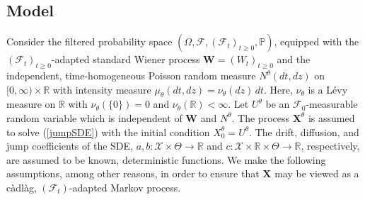 \documentclass[11pt,a4paper]{article}
\newcommand{\PP}{{\mathbb P}}
\newcommand{\RR}{{\mathbb R}}
\newcommand{\W}{{\mathbf W}}
\newcommand{\X}{{\mathbf X}}
\newcommand{\ff}{{\mathcal{F}}}
\newcommand{\xx}{{\mathcal{X}}}
\numberwithin{equation}{section}
\numberwithin{theorem}{section}
\begin{document}
\subsection{Model}
\label{subsection:model}
Consider the filtered probability space $(\Omega, \ff, (\ff_t)_{t\geq 0}, \PP)$, equipped with the $(\ff_t)_{t\geq 0}$-adapted standard Wiener process $\W = (W_t)_{t\geq 0}$ and the independent, time-ho\-mo\-ge\-ne\-ous Poisson random measure $N^\theta(dt,dz)$ on $[0,\infty) \times \RR$ with intensity measure $\mu_\theta(dt,dz) =\nu_\theta(dz)\,dt$. Here, $\nu_\theta$ is a L\'evy measure on $\RR$ with $\nu_\theta(\{0\})=0$ and $\nu_\theta (\RR) < \infty$. Let $U^\theta$ be an $\ff_0$-measurable random variable which is independent of $\W$ and $N^\theta$. The process $\X^\theta$ is assumed to solve (\ref{jumpSDE}) with the initial condition $X^\theta_0=U^\theta$. The drift, diffusion, and jump coefficients of the SDE, $a, b: \xx\times \Theta \to \RR$ and $c: \xx\times \RR\times \Theta \to \RR$, respectively, are assumed to be known, deterministic functions. We make the following assumptions, among other reasons, in order to ensure that $\X$ may be viewed as a c\`{a}dl\`{a}g, $(\ff_t)$-adapted Markov process.
\end{document}
